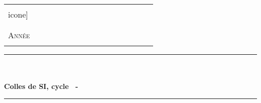 %
%



  \begin{center} %


	\begin{center}
		\begin{tabular}{p{0.2\linewidth}p{0.6\linewidth}}
			\begin{minipage}{\linewidth}
				\begin{center}
					\texttt{[image: \\icone]}\\[0.5cm]
				\end{center}
			\end{minipage}
		&

			\begin{minipage}{\linewidth}
				\begin{center}
					\textsc{\LARGE \etablissement}\\[1cm]
    
					\textsc{\Large \classe}\\[0.5cm]

					\textsc{\Large Année \annee}\\[1cm]
				\end{center}
			\end{minipage}
		\end{tabular}
	\end{center}
	\vspace{0.6cm}

    
    \rule{\linewidth}{0.5mm}\\[0.4cm]

    {\textsc{\partie}}\\[0.4cm]

    { \huge \bfseries Colles de SI, cycle \numero\ - \titre }\\[0.4cm]

    \rule{\linewidth}{0.5mm}\\[1cm]


  \end{center}	%



